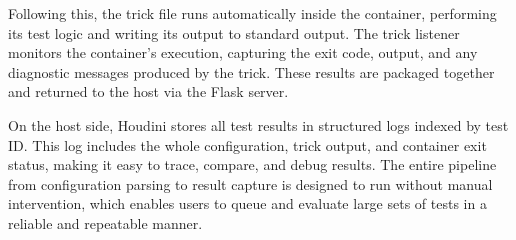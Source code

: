 \documentclass[12pt]{report}
\begin{document}
\begin{doublespace}
Following this, the trick file runs automatically inside the container, performing its test logic and writing its output to standard output. The trick listener monitors the container's execution, capturing the exit code, output, and any diagnostic messages produced by the trick. These results are packaged together and returned to the host via the Flask server.

On the host side, Houdini stores all test results in structured logs indexed by test ID. This log includes the whole configuration, trick output, and container exit status, making it easy to trace, compare, and debug results. The entire pipeline from configuration parsing to result capture is designed to run without manual intervention, which enables users to queue and evaluate large sets of tests in a reliable and repeatable manner.

\end{doublespace} \fontsize{12pt}{14pt} \selectfont
\end{document}

